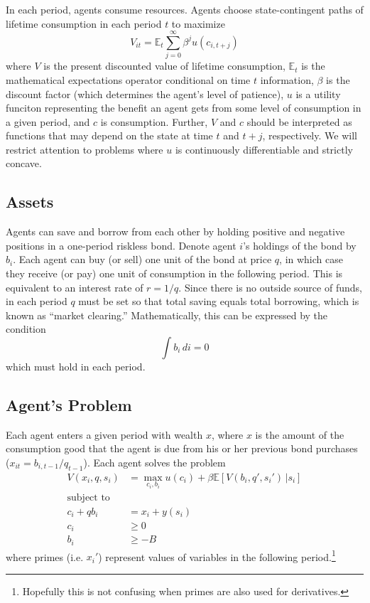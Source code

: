 \documentclass[a4paper,12pt]{article}
\newcommand{\E}{\mathbb{E}}
\numberwithin{equation}{section}
\theoremstyle{definition}
\begin{document}
In each period, agents consume resources. Agents choose
state-contingent paths of lifetime consumption in each period $t$ to
maximize
\begin{equation*}
  V_{it} = \E_t \sum_{j=0}^\infty \beta^j u(c_{i,t+j})
\end{equation*}
where $V$ is the present discounted value of lifetime consumption,
$\E_t$ is the mathematical expectations operator conditional on time
$t$ information, $\beta$ is the discount factor (which determines
the agent's level of patience), $u$ is a utility funciton
representing the benefit an agent gets from some level of
consumption in a given period, and $c$ is consumption. Further, $V$
and $c$ should be interpreted as functions that may depend on the
state at time $t$ and $t+j$, respectively. We will restrict
attention to problems where $u$ is continuously differentiable and
strictly concave.

\subsection{Assets}

Agents can save and borrow from each other by holding positive and
negative positions in a one-period riskless bond. Denote agent $i$'s
holdings of the bond by $b_i$. Each agent can buy (or sell) one unit
of the bond at price $q$, in which case they receive (or pay) one unit
of consumption in the following period. This is equivalent to an
interest rate of $r = 1/q$. Since there is no outside source of funds,
in each period $q$ must be set so that total saving equals total
borrowing, which is known as ``market clearing.'' Mathematically, this
can be expressed by the condition
\begin{equation*}
  \int b_i \,di = 0
\end{equation*}
which must hold in each period.

\subsection{Agent's Problem}

Each agent enters a given period with wealth $x$, where $x$ is the
amount of the consumption good that the agent is due from his or her
previous bond purchases ($x_{it} = b_{i,t-1}/q_{t-1}$). Each agent
solves the problem
\begin{align*}
  V(x_i, q, s_i) &= \max_{c_i, b_i} u(c_i) + \beta \E \left[ V(b_i, q', s_i') \, \Bigr| s_i \right] \\
  \text{subject to}& \\
  c_i + q b_i &= x_i + y(s_i) \\
  c_i &\ge 0 \\
  b_i &\ge -B
\end{align*}
where primes (i.e. $x_i'$) represent values of variables in the
following period.\footnote{Hopefully this is not confusing when primes
  are also used for derivatives.}
\end{document}
